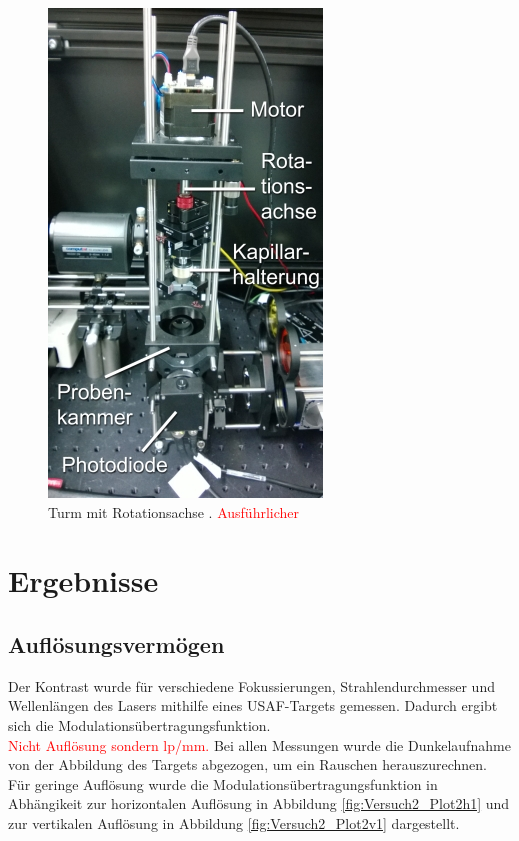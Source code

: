 \begin{minipage}{\linewidth}
\begin{figure}[H]
	\centering
\includegraphics[width=0.491\linewidth]{IMAGE/turm.png}
	\caption{Turm mit Rotationsachse \cite{Anleitung}. \textcolor{red}{Ausführlicher}}
	\label{fig:turm}
\end{figure}

\section{Ergebnisse}
\subsection{Auflösungsvermögen}
Der Kontrast wurde für verschiedene Fokussierungen, Strahlendurchmesser und Wellenlängen des Lasers mithilfe eines USAF-Targets gemessen. Dadurch ergibt sich die Modulationsübertragungsfunktion.\\ 
 \textcolor{red}{Nicht Auflösung sondern lp/mm.}
Bei allen Messungen wurde die Dunkelaufnahme von der Abbildung des Targets abgezogen, um ein Rauschen herauszurechnen.\\
Für geringe Auflösung wurde die Modulationsübertragungsfunktion  in Abhängikeit zur horizontalen Auflösung in Abbildung \ref{fig:Versuch2_Plot2h1} und zur vertikalen Auflösung in Abbildung \ref{fig:Versuch2_Plot2v1} dargestellt.\\
\end{minipage}

